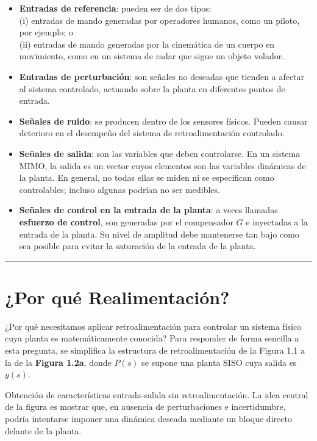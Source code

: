 \begin{itemize}
  \item \textbf{Entradas de referencia}: pueden ser de dos tipos:\\
(i) entradas de mando generadas por operadores humanos, como un piloto, por ejemplo; o\\
(ii) entradas de mando generadas por la cinemática de un cuerpo en movimiento, como en un sistema de radar que sigue un objeto volador.

  \item \textbf{Entradas de perturbación}: son señales no deseadas que tienden a afectar al sistema controlado, actuando sobre la planta en diferentes puntos de entrada.

  \item \textbf{Señales de ruido}: se producen dentro de los sensores físicos. Pueden causar deterioro en el desempeño del sistema de retroalimentación controlado.

  \item \textbf{Señales de salida}: son las variables que deben controlarse. En un sistema MIMO, la salida es un vector cuyos elementos son las variables dinámicas de la planta. En general, no todas ellas se miden ni se especifican como controlables; incluso algunas podrían no ser medibles.

  \item \textbf{Señales de control en la entrada de la planta}: a veces llamadas \textbf{esfuerzo de control}, son generadas por el compensador \(G\) e inyectadas a la entrada de la planta. Su nivel de amplitud debe mantenerse tan bajo como sea posible para evitar la saturación de la entrada de la planta.

\end{itemize}

\noindent\rule{\textwidth}{0.5pt}

\section{¿Por qué Realimentación?}

¿Por qué necesitamos aplicar retroalimentación para controlar un sistema físico cuya planta es matemáticamente conocida? Para responder de forma sencilla a esta pregunta, se simplifica la estructura de retroalimentación de la Figura 1.1 a la de la \textbf{Figura 1.2a}, donde \(P(s)\) se supone una planta SISO cuya salida es \(y(s)\).

\begin{images}[\label{img:figura-1-2}]{Obtención de características entrada-salida sin retroalimentación. La idea central de la figura es mostrar que, en ausencia de perturbaciones e incertidumbre, podría intentarse imponer una dinámica deseada mediante un bloque directo delante de la planta.}
  \imagesnewline
\end{images}


